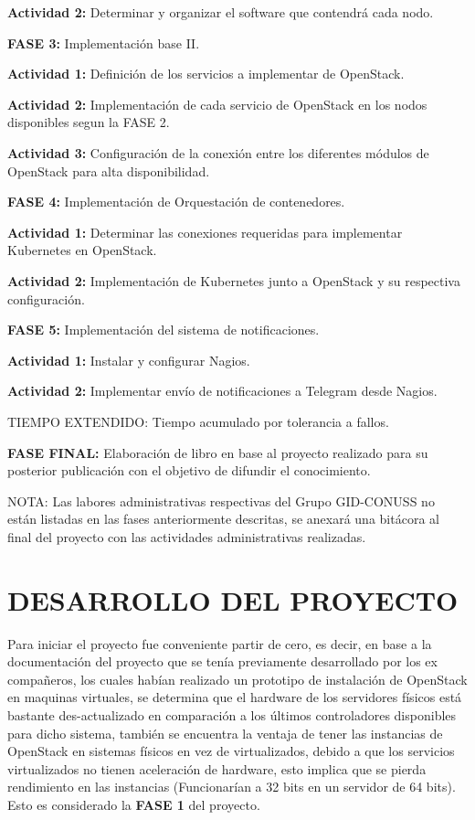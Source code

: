  \textbf{Actividad 2:} Determinar y organizar el software que contendrá cada nodo. 

 \textbf{FASE 3:} Implementación base II. 
 
 \textbf{Actividad 1:} Definición de los servicios a implementar de OpenStack. 
 
 \textbf{Actividad 2:} Implementación de cada servicio de OpenStack en los nodos disponibles segun la FASE 2. 
 
 \textbf{Actividad 3:} Configuración de la conexión entre los diferentes módulos de OpenStack para alta disponibilidad. 
 
 \textbf{FASE 4:} Implementación de Orquestación de contenedores. 
 
 \textbf{Actividad 1:} Determinar las conexiones requeridas para implementar Kubernetes en OpenStack. 
 
 \textbf{Actividad 2:} Implementación de Kubernetes junto a  OpenStack y su respectiva configuración. 
 
 \textbf{FASE 5:} Implementación del sistema de notificaciones. 
 
 \textbf{Actividad 1:} Instalar y configurar Nagios. 
 
 \textbf{Actividad 2:} Implementar envío de notificaciones a Telegram desde Nagios. 
 
 TIEMPO EXTENDIDO: Tiempo acumulado por tolerancia a fallos. 
 
 \textbf{FASE FINAL:} Elaboración de libro en base al proyecto realizado para su posterior publicación con el objetivo de difundir el conocimiento.  
 
 NOTA:  Las labores administrativas respectivas del Grupo GID-CONUSS no están listadas en las fases anteriormente descritas, se anexará una bitácora al final del proyecto con las actividades administrativas realizadas. 
 
 
    
    \newpage\chapter{DESARROLLO DEL PROYECTO} 
    
    Para iniciar el proyecto fue conveniente partir de cero, es decir, en base a la documentación del proyecto que se tenía previamente desarrollado por los ex compañeros, los cuales habían realizado un prototipo de instalación de OpenStack en maquinas virtuales, se determina que el hardware de los servidores físicos está bastante des-actualizado en comparación a los últimos controladores disponibles para dicho sistema, también se encuentra la ventaja de tener las instancias de OpenStack en sistemas físicos en vez de virtualizados, debido a que los servicios virtualizados no tienen aceleración de hardware, esto implica que se pierda rendimiento en las instancias (Funcionarían a 32 bits en un servidor de 64 bits). Esto es considerado la \textbf{FASE 1} del proyecto.
    
